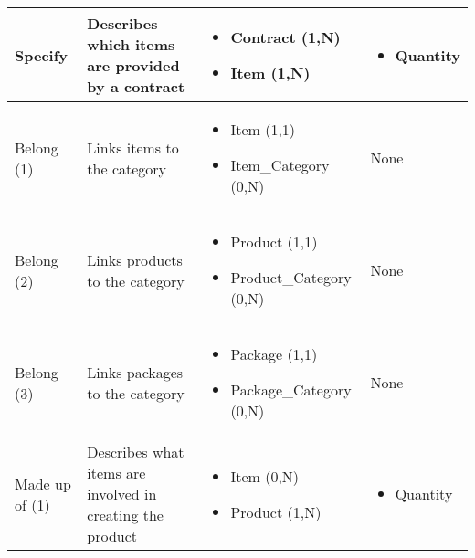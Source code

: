 \begin{longtable}{|p{}|p{} |p{}|p{} |}
Specify & Describes which items are provided by a contract  & \begin{itemize}
	\vspace{-1em}
	\item Contract (1,N)
	\item Item (1,N)
	\end{itemize}
&  \begin{itemize}
      	    \vspace{-1em}
       	\item Quantity
      \end{itemize}\\\hline

Belong (1) & Links items to the category  & \begin{itemize}
	\vspace{-1em}
	\item Item (1,1)
	\item Item\_Category (0,N)
\end{itemize}
&  None \\\hline


Belong (2) & Links products to the category & \begin{itemize}
	\vspace{-1em}
	\item Product (1,1)
	\item Product\_Category (0,N)
\end{itemize}
&  None \\\hline

Belong (3) & Links packages to the category  & \begin{itemize}
	\vspace{-1em}
	\item Package (1,1)
	\item Package\_Category (0,N)
\end{itemize}
&  None \\\hline

Made up of (1) & Describes what items are involved in creating the product &
\begin{itemize}
	\vspace{-1em}
	\item Item (0,N)
	\item Product (1,N)
\end{itemize}
&  \begin{itemize}
   	    \vspace{-1em}
    	\item Quantity
   \end{itemize} \\\hline


\end{longtable}
